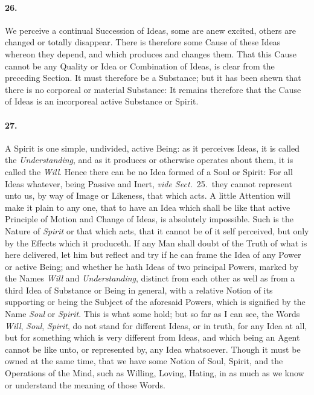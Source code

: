 \documentclass[]{article}
\newenvironment{sectionbody}{\begin{multicols}{2}}{\end{multicols}}
\begin{document}
\begin{sectionbody}
\paragraph{26.} We perceive a continual Succession of Ideas, some are anew
excited, others are changed or totally disappear.  There is
therefore some Cause of these Ideas whereon they depend, and
which produces and changes them.  That this Cause cannot be any
Quality or Idea or Combination of Ideas, is clear from the
preceding Section.  It must therefore be a Substance; but it has
been shewn that there is no corporeal or material Substance: It
remains therefore that the Cause of Ideas is an incorporeal
active Substance or Spirit.



\paragraph{27.} A Spirit is one simple, undivided, active Being: as it perceives
Ideas, it is called the \emph{Understanding}, and as it
produces or otherwise operates about them, it is called the
\emph{Will}.  Hence there can be no Idea formed of a
Soul or Spirit: For all Ideas whatever, being Passive and Inert,
\emph{vide Sect.}~25.\ they cannot represent unto us, by way of
Image or Likeness, that
which acts.  A little Attention will make it plain to any one,
that to have an Idea which shall be like that active Principle of
Motion and Change of Ideas, is absolutely impossible.  Such is
the Nature of \emph{Spirit} or that which acts, that it cannot
be of it self perceived, but only by the Effects which it
produceth.  If any Man shall doubt of the Truth of what is here
delivered, let him but reflect and try if he can frame the Idea
of any Power or active Being; and whether he hath Ideas of two
principal Powers, marked by the Names \emph{Will} and
\emph{Understanding}, distinct from each other as well as from
a third Idea of Substance or Being in general, with a relative
Notion of its supporting or being the Subject of the aforesaid
Powers, which is signified by the Name \emph{Soul} or
\emph{Spirit}.  This is what some hold; but so far as I can
see, the Words \emph{Will}, \emph{Soul}, \emph{Spirit}, do
not stand for different Ideas, or in truth, for any Idea at all,
but for something which is very different from Ideas, and which
being an Agent cannot be like unto, or represented by, any Idea
whatsoever.  Though it must be owned at the same time, that we
have some Notion of Soul, Spirit, and the Operations of the Mind,
such as Willing, Loving, Hating, in as much as we know or
understand the meaning of those Words.




\end{sectionbody}
\end{document}
